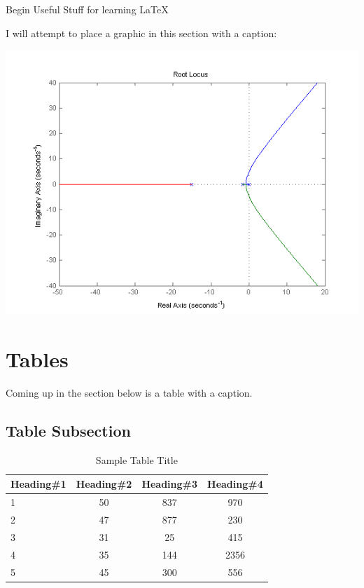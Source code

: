 \documentclass[12pt]{article} %
\begin{document}
\clearpage
{\Large{\color{red}Begin Useful Stuff for learning LaTeX}}

I will attempt to place a graphic in this section with a caption:
\begin{center}
\includegraphics{rootlocus.png}
\end{center}

\clearpage

\section{Tables}

Coming up in the section below is a table with a caption.

\subsection{Table Subsection}

\begin{table}[ht]
\caption{Sample Table Title} %
\centering %
\begin{tabular}{l | c c c} %
\hline\hline %
Heading\#1 & Heading\#2 & Heading\#3 & Heading\#4 \\ [0.5ex] %
\hline %
1 & 50 & 837 & 970 \\ %
2 & 47 & 877 & 230 \\
3 & 31 & 25 & 415 \\
4 & 35 & 144 & 2356 \\
5 & 45 & 300 & 556 \\ [1ex] %
\hline %
\end{tabular}
\label{table:nonlin} %
\end{table}
\end{document}
